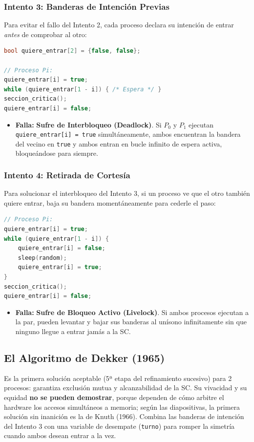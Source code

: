 \subsubsection{Intento 3: Banderas de Intención Previas}
Para evitar el fallo del Intento 2, cada proceso declara su intención de entrar \textit{antes} de comprobar al otro:
\begin{lstlisting}[language=C++]
bool quiere_entrar[2] = {false, false};

// Proceso Pi:
quiere_entrar[i] = true;
while (quiere_entrar[1 - i]) { /* Espera */ }
seccion_critica();
quiere_entrar[i] = false;
\end{lstlisting}
\begin{itemize}
    \item \textbf{Falla:} \textbf{Sufre de Interbloqueo (Deadlock)}. Si $P_0$ y $P_1$ ejecutan \texttt{quiere\_entrar[i] = true} simultáneamente, ambos encuentran la bandera del vecino en \texttt{true} y ambos entran en bucle infinito de espera activa, bloqueándose para siempre.
\end{itemize}

\subsubsection{Intento 4: Retirada de Cortesía}
Para solucionar el interbloqueo del Intento 3, si un proceso ve que el otro también quiere entrar, baja su bandera momentáneamente para cederle el paso:
\begin{lstlisting}[language=C++]
// Proceso Pi:
quiere_entrar[i] = true;
while (quiere_entrar[1 - i]) {
    quiere_entrar[i] = false;
    sleep(random);
    quiere_entrar[i] = true;
}
seccion_critica();
quiere_entrar[i] = false;
\end{lstlisting}
\begin{itemize}
    \item \textbf{Falla:} \textbf{Sufre de Bloqueo Activo (Livelock)}. Si ambos procesos ejecutan a la par, pueden levantar y bajar sus banderas al unísono infinitamente sin que ninguno llegue a entrar jamás a la SC.
\end{itemize}

\subsection{El Algoritmo de Dekker (1965)}
Es la primera solución aceptable (5ª etapa del refinamiento sucesivo) para 2 procesos: garantiza exclusión mutua y alcanzabilidad de la SC. Su vivacidad y su equidad \textbf{no se pueden demostrar}, porque dependen de cómo arbitre el hardware los accesos simultáneos a memoria; según las diapositivas, la primera solución sin inanición es la de Knuth (1966). Combina las banderas de intención del Intento 3 con una variable de desempate (\texttt{turno}) para romper la simetría cuando ambos desean entrar a la vez.

